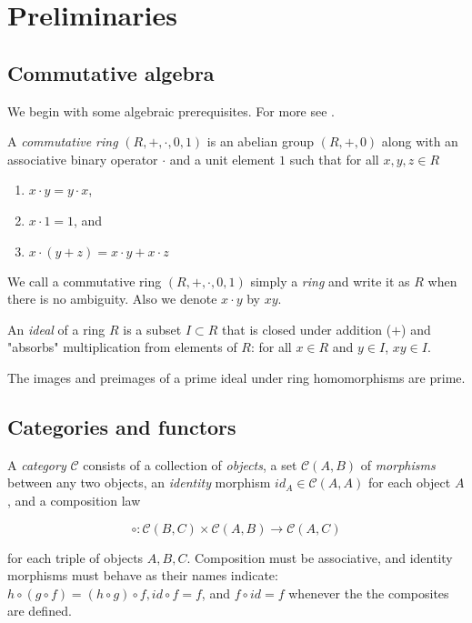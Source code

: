 \documentclass[ag.tex]{subfiles}
\begin{document}
\chapter{Preliminaries}

\section{Commutative algebra}

We begin with some algebraic prerequisites.  For more see \cite{atiyah2018introduction}.

\begin{definition}
A \textit{commutative ring} $(R, +, \cdot, 0,1)$ is an abelian group $(R,+,0)$ along with an associative binary operator $\cdot$ and a unit element $1$ such that for all $x,y,z \in R$

\begin{enumerate}
\item $x \cdot y = y \cdot x$,
\item $x \cdot 1 = 1$, and
\item $x\cdot(y+z) = x\cdot y+x\cdot z$

\end{enumerate}

\end{definition}

We call a commutative ring $(R, +, \cdot , 0,1)$ simply a \textit{ring} and write it as $R$ when there is no ambiguity. Also we denote $x \cdot y$ by $xy$.

\begin{definition}
An \textit{ideal} of a ring $R$ is a subset $I \subset R$ that is closed under addition ($+$) and "absorbs" multiplication from elements of $R$: for all $x \in R$ and $y \in I$,  $xy \in I$.
\end{definition}

\begin{proposition}\label{primes_map_to_primes}
The images and preimages of a prime ideal under ring homomorphisms are prime.
\end{proposition}

\section{Categories and functors}

\begin{definition}
A \textit{category} $\mathcal{C}$ consists of a collection of \textit{objects}, a set $\mathcal{C}(A,B)$ of \textit{morphisms} between any two objects, an \textit{identity} morphism $id_A \in \mathcal{C}(A,A)$ for each object $A$, and a composition law

\begin{equation}
\circ : \mathcal{C} ( B , C ) \times \mathcal{C} ( A , B ) \to \mathcal{C} ( A , C )
\end{equation}

for each triple of objects $A, B, C$.  Composition must be associative, and identity
morphisms must behave as their names indicate: $h \circ (g\circ f)=(h\circ g)\circ f, id\circ f=f$, and $f\circ id=f$
whenever the the composites are defined.
\end{definition}
\end{document}
